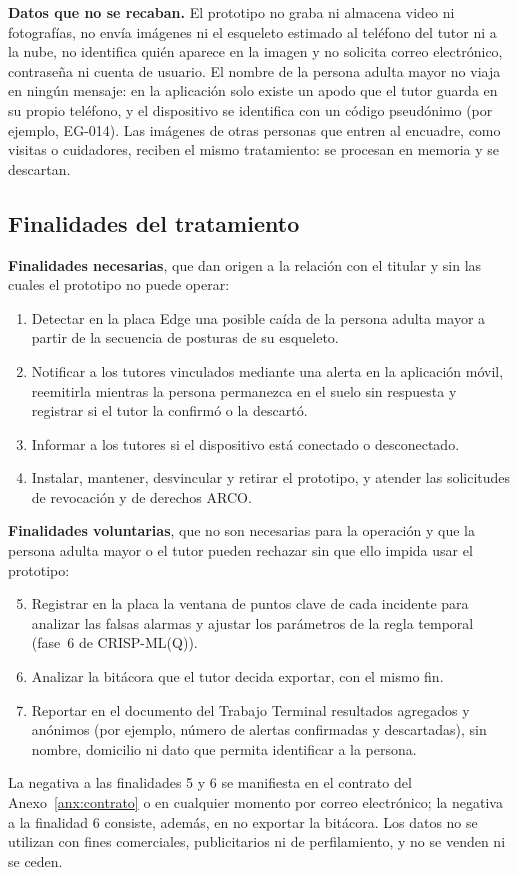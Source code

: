 \documentclass[12pt,a4paper,oneside]{book}
\theoremstyle{plain}
\theoremstyle{definition}
\theoremstyle{remark}
\begin{document}
\textbf{Datos que no se recaban.} El prototipo no graba ni almacena video ni fotografías, no envía imágenes ni el esqueleto estimado al teléfono del tutor ni a la nube, no identifica quién aparece en la imagen y no solicita correo electrónico, contraseña ni cuenta de usuario. El nombre de la persona adulta mayor no viaja en ningún mensaje: en la aplicación solo existe un apodo que el tutor guarda en su propio teléfono, y el dispositivo se identifica con un código pseudónimo (por ejemplo, EG-014). Las imágenes de otras personas que entren al encuadre, como visitas o cuidadores, reciben el mismo tratamiento: se procesan en memoria y se descartan.

\subsection{Finalidades del tratamiento}

\textbf{Finalidades necesarias}, que dan origen a la relación con el titular y sin las cuales el prototipo no puede operar:
\begin{enumerate}
  \item Detectar en la placa Edge una posible caída de la persona adulta mayor a partir de la secuencia de posturas de su esqueleto.
  \item Notificar a los tutores vinculados mediante una alerta en la aplicación móvil, reemitirla mientras la persona permanezca en el suelo sin respuesta y registrar si el tutor la confirmó o la descartó.
  \item Informar a los tutores si el dispositivo está conectado o desconectado.
  \item Instalar, mantener, desvincular y retirar el prototipo, y atender las solicitudes de revocación y de derechos ARCO.
\end{enumerate}

\textbf{Finalidades voluntarias}, que no son necesarias para la operación y que la persona adulta mayor o el tutor pueden rechazar sin que ello impida usar el prototipo:
\begin{enumerate}\setcounter{enumi}{4}
  \item Registrar en la placa la ventana de puntos clave de cada incidente para analizar las falsas alarmas y ajustar los parámetros de la regla temporal (fase~6 de CRISP-ML(Q)).
  \item Analizar la bitácora que el tutor decida exportar, con el mismo fin.
  \item Reportar en el documento del Trabajo Terminal resultados agregados y anónimos (por ejemplo, número de alertas confirmadas y descartadas), sin nombre, domicilio ni dato que permita identificar a la persona.
\end{enumerate}
La negativa a las finalidades 5 y 6 se manifiesta en el contrato del Anexo~\ref{anx:contrato} o en cualquier momento por correo electrónico; la negativa a la finalidad 6 consiste, además, en no exportar la bitácora. Los datos no se utilizan con fines comerciales, publicitarios ni de perfilamiento, y no se venden ni se ceden.
\end{document}
